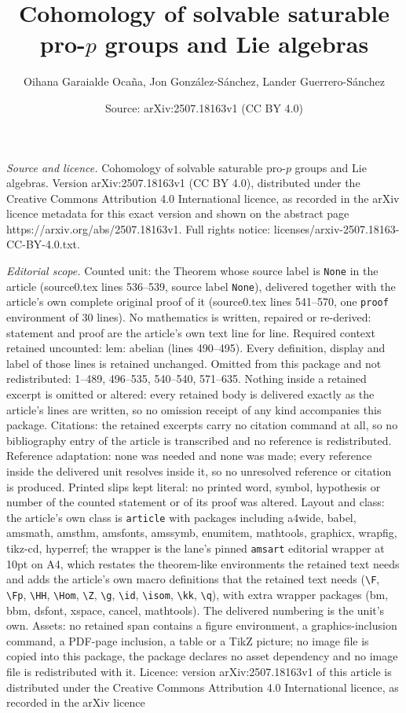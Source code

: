 \documentclass[10pt,a4paper]{amsart}
\title[Cohomology of solvable saturable pro-$p$ groups and Lie alge]{Cohomology of solvable saturable pro-$p$ groups and Lie algebras}
\author{Oihana Garaialde Oca\~na, Jon Gonz\'alez-S\'anchez, Lander Guerrero-S\'anchez}
\date{Source: arXiv:2507.18163v1 (CC BY 4.0)}
\begin{document}
\maketitle

\noindent\emph{Source and licence.} Cohomology of solvable saturable pro-$p$ groups and Lie algebras. Version arXiv:2507.18163v1 (CC BY 4.0), distributed under the Creative Commons Attribution 4.0 International licence, as recorded in the arXiv licence metadata for this exact version and shown on the abstract page https://arxiv.org/abs/2507.18163v1. Full rights notice: licenses/arxiv-2507.18163-CC-BY-4.0.txt.\par\smallskip

\noindent\textit{Editorial scope.} Counted unit: the Theorem whose source label is \texttt{None} in the article (source0.tex lines 536--539, source label \texttt{None}), delivered together with the article's own complete original proof of it (source0.tex lines 541--570, one \texttt{proof} environment of 30 lines). No mathematics is written, repaired or re-derived: statement and proof are the article's own text line for line. Required context retained uncounted: lem: abelian (lines 490--495). Every definition, display and label of those lines is retained unchanged. Omitted from this package and not redistributed: 1--489, 496--535, 540--540, 571--635. Nothing inside a retained excerpt is omitted or altered: every retained body is delivered exactly as the article's lines are written, so no omission receipt of any kind accompanies this package. Citations: the retained excerpts carry no citation command at all, so no bibliography entry of the article is transcribed and no reference is redistributed. Reference adaptation: none was needed and none was made; every reference inside the delivered unit resolves inside it, so no unresolved reference or citation is produced. Printed slips kept literal: no printed word, symbol, hypothesis or number of the counted statement or of its proof was altered. Layout and class: the article's own class is \texttt{article} with packages including a4wide, babel, amsmath, amsthm, amsfonts, amssymb, enumitem, mathtools, graphicx, wrapfig, tikz-cd, hyperref; the wrapper is the lane's pinned \texttt{amsart} editorial wrapper at 10pt on A4, which restates the theorem-like environments the retained text needs and adds the article's own macro definitions that the retained text needs (\texttt{\textbackslash F}, \texttt{\textbackslash Fp}, \texttt{\textbackslash HH}, \texttt{\textbackslash Hom}, \texttt{\textbackslash Z}, \texttt{\textbackslash g}, \texttt{\textbackslash id}, \texttt{\textbackslash isom}, \texttt{\textbackslash kk}, \texttt{\textbackslash q}), with extra wrapper packages (bm, bbm, dsfont, xspace, cancel, mathtools). The delivered numbering is the unit's own. Assets: no retained span contains a figure environment, a graphics-inclusion command, a PDF-page inclusion, a table or a TikZ picture; no image file is copied into this package, the package declares no asset dependency and no image file is redistributed with it. Licence: version arXiv:2507.18163v1 of this article is distributed under the Creative Commons Attribution 4.0 International licence, as recorded in the arXiv licence 
\end{document}
